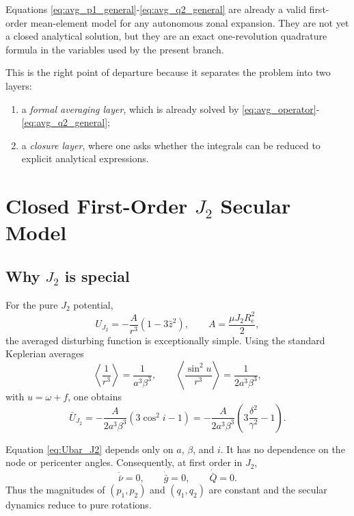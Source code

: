 \documentclass[11pt]{article}
\begin{document}
Equations \eqref{eq:avg_p1_general}-\eqref{eq:avg_q2_general} are already a
valid first-order mean-element model for any autonomous zonal expansion.
They are not yet a closed analytical solution, but they are an exact
one-revolution quadrature formula in the variables used by the present branch.

This is the right point of departure because it separates the
problem into two layers:
\begin{enumerate}
    \item a \emph{formal averaging layer}, which is already solved by
    \eqref{eq:avg_operator}-\eqref{eq:avg_q2_general};
    \item a \emph{closure layer}, where one asks whether the integrals can be
    reduced to explicit analytical expressions.
\end{enumerate}

\section{Closed First-Order \texorpdfstring{$J_2$}{J2} Secular Model}
\label{sec:j2}

\subsection{Why \texorpdfstring{$J_2$}{J2} is special}

For the pure $J_2$ potential,
\begin{equation}
U_{J_2} = -\frac{A}{r^3}\left(1-3\hat z^2\right),
\qquad
A = \frac{\mu J_2 R_e^2}{2},
\end{equation}
the averaged disturbing function is exceptionally simple. Using the standard
Keplerian averages
\begin{equation}
\left\langle \frac{1}{r^3}\right\rangle
= \frac{1}{a^3\beta^3},
\qquad
\left\langle \frac{\sin^2 u}{r^3}\right\rangle
= \frac{1}{2a^3\beta^3},
\end{equation}
with $u=\omega+f$, one obtains
\begin{equation}
\bar U_{J_2}
= -\frac{A}{2a^3\beta^3}\left(3\cos^2 i - 1\right)
= -\frac{A}{2a^3\beta^3}
\left(3\frac{\delta^2}{\gamma^2} - 1\right).
\label{eq:Ubar_J2}
\end{equation}

Equation \eqref{eq:Ubar_J2} depends only on $a$, $\beta$, and $i$. It has no
dependence on the node or pericenter angles. Consequently, at first order in
$J_2$,
\begin{equation}
\dot{\bar\nu} = 0,
\qquad
\dot{\bar g} = 0,
\qquad
\dot{\bar Q} = 0.
\end{equation}
Thus the magnitudes of $(p_1,p_2)$ and $(q_1,q_2)$ are constant and the secular
dynamics reduce to pure rotations.
\end{document}
